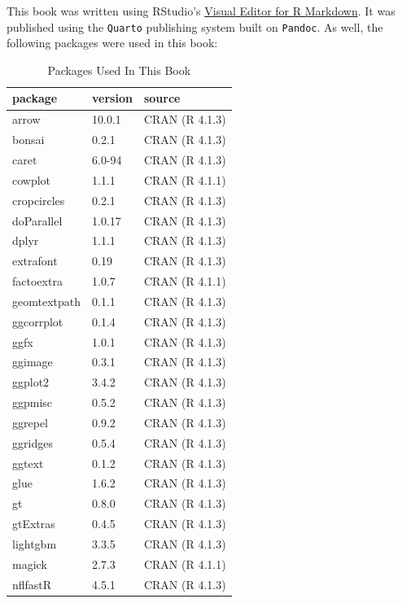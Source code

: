 \documentclass[
  letterpaper,
]{krantz}
\begin{document}

This book was written using RStudio's
\href{https://rstudio.github.io/visual-markdown-editing/}{Visual Editor
for R Markdown}. It was published using the \texttt{Quarto} publishing
system built on \texttt{Pandoc}. As well, the following packages were
used in this book:

\begin{table}

\caption{Packages Used In This Book}
\centering
\begin{tabular}[t]{l|l|l}
\hline
package & version & source\\
\hline
arrow & 10.0.1 & CRAN (R 4.1.3)\\
\hline
bonsai & 0.2.1 & CRAN (R 4.1.3)\\
\hline
caret & 6.0-94 & CRAN (R 4.1.3)\\
\hline
cowplot & 1.1.1 & CRAN (R 4.1.1)\\
\hline
cropcircles & 0.2.1 & CRAN (R 4.1.3)\\
\hline
doParallel & 1.0.17 & CRAN (R 4.1.3)\\
\hline
dplyr & 1.1.1 & CRAN (R 4.1.3)\\
\hline
extrafont & 0.19 & CRAN (R 4.1.3)\\
\hline
factoextra & 1.0.7 & CRAN (R 4.1.1)\\
\hline
geomtextpath & 0.1.1 & CRAN (R 4.1.3)\\
\hline
ggcorrplot & 0.1.4 & CRAN (R 4.1.3)\\
\hline
ggfx & 1.0.1 & CRAN (R 4.1.3)\\
\hline
ggimage & 0.3.1 & CRAN (R 4.1.3)\\
\hline
ggplot2 & 3.4.2 & CRAN (R 4.1.3)\\
\hline
ggpmisc & 0.5.2 & CRAN (R 4.1.3)\\
\hline
ggrepel & 0.9.2 & CRAN (R 4.1.3)\\
\hline
ggridges & 0.5.4 & CRAN (R 4.1.3)\\
\hline
ggtext & 0.1.2 & CRAN (R 4.1.3)\\
\hline
glue & 1.6.2 & CRAN (R 4.1.3)\\
\hline
gt & 0.8.0 & CRAN (R 4.1.3)\\
\hline
gtExtras & 0.4.5 & CRAN (R 4.1.3)\\
\hline
lightgbm & 3.3.5 & CRAN (R 4.1.3)\\
\hline
magick & 2.7.3 & CRAN (R 4.1.1)\\
\hline
nflfastR & 4.5.1 & CRAN (R 4.1.3)\\

\end{tabular}
\end{table}
\end{document}
